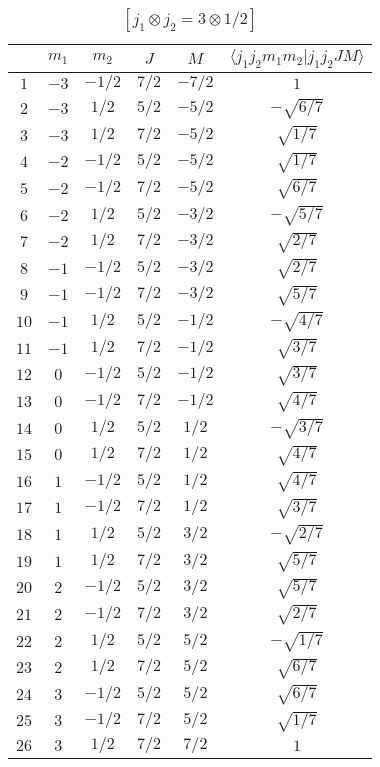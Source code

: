 \begin{table}
\tiny
\caption{$[j_1 \otimes j_2 = 3 \otimes 1/2]$}
\begin{center}
\begin{tabular}{|c|c|c|c|c|c|}
\hline 
   & $m_1$ & $m_2$ & $J$ & $M$ & $\langle j_1 j_2 m_1 m_2 | j_1 j_2 J M \rangle$ \\ 
\hline 
$1$ & $-3$ & $-1/2$ & $7/2$ & $-7/2$ & $1$ \\ 
$2$ & $-3$ & $1/2$ & $5/2$ & $-5/2$ & $-\sqrt{6/7}$ \\ 
$3$ & $-3$ & $1/2$ & $7/2$ & $-5/2$ & $\sqrt{1/7}$ \\ 
$4$ & $-2$ & $-1/2$ & $5/2$ & $-5/2$ & $\sqrt{1/7}$ \\ 
$5$ & $-2$ & $-1/2$ & $7/2$ & $-5/2$ & $\sqrt{6/7}$ \\ 
$6$ & $-2$ & $1/2$ & $5/2$ & $-3/2$ & $-\sqrt{5/7}$ \\ 
$7$ & $-2$ & $1/2$ & $7/2$ & $-3/2$ & $\sqrt{2/7}$ \\ 
$8$ & $-1$ & $-1/2$ & $5/2$ & $-3/2$ & $\sqrt{2/7}$ \\ 
$9$ & $-1$ & $-1/2$ & $7/2$ & $-3/2$ & $\sqrt{5/7}$ \\ 
$10$ & $-1$ & $1/2$ & $5/2$ & $-1/2$ & $-\sqrt{4/7}$ \\ 
$11$ & $-1$ & $1/2$ & $7/2$ & $-1/2$ & $\sqrt{3/7}$ \\ 
$12$ & $0$ & $-1/2$ & $5/2$ & $-1/2$ & $\sqrt{3/7}$ \\ 
$13$ & $0$ & $-1/2$ & $7/2$ & $-1/2$ & $\sqrt{4/7}$ \\ 
$14$ & $0$ & $1/2$ & $5/2$ & $1/2$ & $-\sqrt{3/7}$ \\ 
$15$ & $0$ & $1/2$ & $7/2$ & $1/2$ & $\sqrt{4/7}$ \\ 
$16$ & $1$ & $-1/2$ & $5/2$ & $1/2$ & $\sqrt{4/7}$ \\ 
$17$ & $1$ & $-1/2$ & $7/2$ & $1/2$ & $\sqrt{3/7}$ \\ 
$18$ & $1$ & $1/2$ & $5/2$ & $3/2$ & $-\sqrt{2/7}$ \\ 
$19$ & $1$ & $1/2$ & $7/2$ & $3/2$ & $\sqrt{5/7}$ \\ 
$20$ & $2$ & $-1/2$ & $5/2$ & $3/2$ & $\sqrt{5/7}$ \\ 
$21$ & $2$ & $-1/2$ & $7/2$ & $3/2$ & $\sqrt{2/7}$ \\ 
$22$ & $2$ & $1/2$ & $5/2$ & $5/2$ & $-\sqrt{1/7}$ \\ 
$23$ & $2$ & $1/2$ & $7/2$ & $5/2$ & $\sqrt{6/7}$ \\ 
$24$ & $3$ & $-1/2$ & $5/2$ & $5/2$ & $\sqrt{6/7}$ \\ 
$25$ & $3$ & $-1/2$ & $7/2$ & $5/2$ & $\sqrt{1/7}$ \\ 
$26$ & $3$ & $1/2$ & $7/2$ & $7/2$ & $1$ \\ 
\hline 
\end{tabular}
\end{center}
\end{table}

